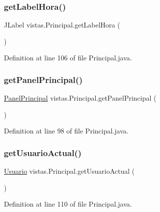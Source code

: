 \subsubsection{\texorpdfstring{get\+Label\+Hora()}{getLabelHora()}}
{\footnotesize\ttfamily J\+Label vistas.\+Principal.\+get\+Label\+Hora (\begin{DoxyParamCaption}{ }\end{DoxyParamCaption})}



Definition at line 106 of file Principal.\+java.

\mbox{\label{classvistas_1_1_principal_a546a7dca6785535d3f48f5a7b43c20a1}} 
\subsubsection{\texorpdfstring{get\+Panel\+Principal()}{getPanelPrincipal()}}
{\footnotesize\ttfamily \mbox{\hyperlink{classpaneles_1_1_panel_principal}{Panel\+Principal}} vistas.\+Principal.\+get\+Panel\+Principal (\begin{DoxyParamCaption}{ }\end{DoxyParamCaption})}



Definition at line 98 of file Principal.\+java.

\mbox{\label{classvistas_1_1_principal_af7ea8d6ba599873466968add34233be0}} 
\subsubsection{\texorpdfstring{get\+Usuario\+Actual()}{getUsuarioActual()}}
{\footnotesize\ttfamily \mbox{\hyperlink{classobjetos_1_1_usuario}{Usuario}} vistas.\+Principal.\+get\+Usuario\+Actual (\begin{DoxyParamCaption}{ }\end{DoxyParamCaption})}



Definition at line 110 of file Principal.\+java.

